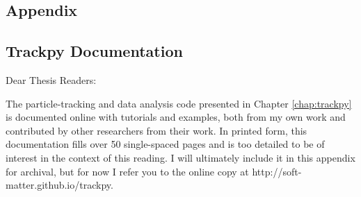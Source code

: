 \begin{appendices}
\chapter{Appendix}

\section{Trackpy Documentation}

\noindent Dear Thesis Readers:

The particle-tracking and data analysis code presented in Chapter \ref{chap:trackpy} is documented online with tutorials and examples, both from my own work and contributed by other researchers from their work. In printed form, this documentation fills over 50 single-spaced pages and is too detailed to be of interest in the context of this reading. I will ultimately include it in this appendix for archival, but for now I refer you to the online copy at http://soft-matter.github.io/trackpy.

\end{appendices}